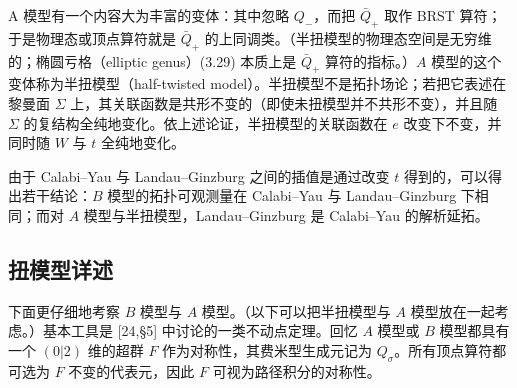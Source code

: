 
\label{op:35}
A 模型有一个内容大为丰富的变体：其中忽略 $Q_-$，而把 $\bar Q_+$ 取作 BRST 算符；于是物理态或顶点算符就是 $\bar Q_+$ 的上同调类。（半扭模型的物理态空间是无穷维的；椭圆亏格（elliptic genus）(3.29) 本质上是 $\bar Q_+$ 算符的指标。）$A$ 模型的这个变体称为半扭模型（half-twisted model）。半扭模型不是拓扑场论；若把它表述在黎曼面 $\Sigma$ 上，其关联函数是共形不变的（即使未扭模型并不共形不变），并且随 $\Sigma$ 的复结构全纯地变化。依上述论证，半扭模型的关联函数在 $e$ 改变下不变，并同时随 $W$ 与 $t$ 全纯地变化。

由于 Calabi--Yau 与 Landau--Ginzburg 之间的插值是通过改变 $t$ 得到的，可以得出若干结论：$B$ 模型的拓扑可观测量在 Calabi--Yau 与 Landau--Ginzburg 下相同；而对 $A$ 模型与半扭模型，Landau--Ginzburg 是 Calabi--Yau 的解析延拓。

\subsection{扭模型详述}

下面更仔细地考察 $B$ 模型与 $A$ 模型。（以下可以把半扭模型与 $A$ 模型放在一起考虑。）基本工具是 [24,§5] 中讨论的一类不动点定理。回忆 $A$ 模型或 $B$ 模型都具有一个 $(0|2)$ 维的超群 $F$ 作为对称性，其费米型生成元记为 $Q_\sigma$。所有顶点算符都可选为 $F$ 不变的代表元，因此 $F$ 可视为路径积分的对称性。

